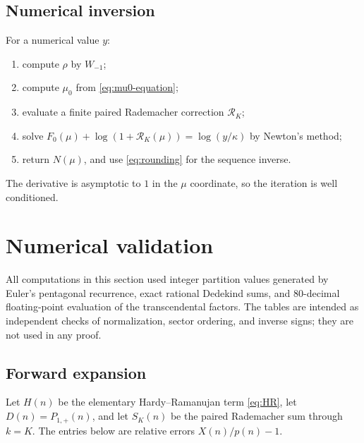 \documentclass[11pt,a4paper]{article}
\numberwithin{equation}{section}
\theoremstyle{definition}
\theoremstyle{remark}
\newcommand{\Rcal}{\mathcal R}
\begin{document}
\subsection{Numerical inversion}

For a numerical value $y$:
\begin{enumerate}[label=\arabic*.]
\item compute $\rho$ by $W_{-1}$;
\item compute $\mu_0$ from \eqref{eq:mu0-equation};
\item evaluate a finite paired Rademacher correction $\Rcal_K$;
\item solve
$F_0(\mu)+\log(1+\Rcal_K(\mu))=\log(y/\kappa)$ by Newton's method;
\item return $N(\mu)$, and use \eqref{eq:rounding} for the sequence inverse.
\end{enumerate}
The derivative is asymptotic to $1$ in the $\mu$ coordinate, so the iteration is
well conditioned.

\section{Numerical validation}

All computations in this section used integer partition values generated by
Euler's pentagonal recurrence, exact rational Dedekind sums, and 80-decimal
floating-point evaluation of the transcendental factors.  The tables are
intended as independent checks of normalization, sector ordering, and inverse
signs; they are not used in any proof.

\subsection{Forward expansion}

Let $H(n)$ be the elementary Hardy--Ramanujan term \eqref{eq:HR}, let
$D(n)=P_{1,+}(n)$, and let $S_K(n)$ be the paired Rademacher sum through $k=K$.
The entries below are relative errors $X(n)/p(n)-1$.
\end{document}
